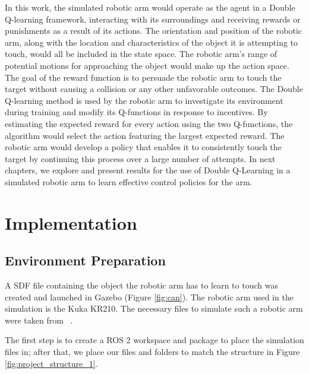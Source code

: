 \documentclass[12pt,oneside]{article}
\begin{document}
In this work, the simulated robotic arm would operate as the agent in a Double Q-learning framework, interacting with its surroundings and receiving rewards or punishments as a result of its actions. The orientation and position of the robotic arm, along with the location and characteristics of the object it is attempting to touch, would all be included in the state space. The robotic arm's range of potential motions for approaching the object would make up the action space. The goal of the reward function is to persuade the robotic arm to touch the target without causing a collision or any other unfavorable outcomes.
The Double Q-learning method is used by the robotic arm to investigate its environment during training and modify its Q-functions in response to incentives. By estimating the expected reward for every action using the two Q-functions, the algorithm would select the action featuring the largest expected reward. The robotic arm would develop a policy that enables it to consistently touch the target by continuing this process over a large number of attempts. In next chapters, we explore and present results for the use of Double Q-Learning in a simulated robotic arm to learn effective control policies for the arm.

%
\section{Implementation}\label{sec:umsetzung}
\subsection{Environment Preparation}\label{sec:env-preparation}
A SDF file containing the object the robotic arm has to learn to touch was created and launched in Gazebo (Figure \ref{fig:can}).
The robotic arm used in the simulation is the Kuka KR210. The necessary files to simulate such a robotic arm were taken from ~\cite{RoboND-Kinematics-Project}. 

The first step is to create a ROS 2 workspace and package to place the simulation files in; after that, we place our files and folders to match the structure in Figure \ref{fig:project_structure_1}.
\end{document}
